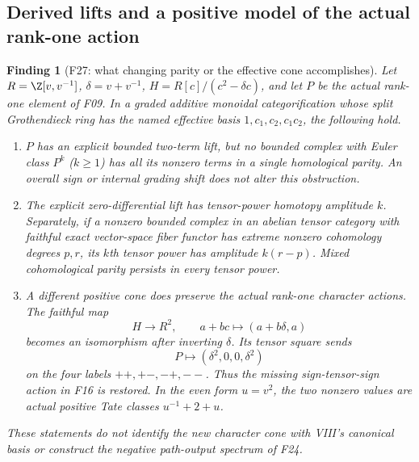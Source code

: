 \documentclass[11pt,a4paper]{article}
\newcommand{\fid}[1]{\textsf{#1}}\newcommand{\gate}[1]{\textsf{#1}}
\theoremstyle{named}\newtheorem{finding}{Finding}[section]
\theoremstyle{definition}\newtheorem{definition}[finding]{Definition}
\theoremstyle{remark}\newtheorem{remark}[finding]{Remark}
\begin{document}
\subsection{Derived lifts and a positive model of the actual rank-one action}
\begin{finding}[\fid{F27}: what changing parity or the effective cone accomplishes]\label{f:derived}
Let $R=\Z[v,v^{-1}]$, $\delta=v+v^{-1}$,
$H=R[c]/(c^2-\delta c)$, and let $P$ be the actual rank-one element
of \fid{F09}. In a graded additive monoidal categorification whose
split Grothendieck ring has the named effective basis
$1,c_1,c_2,c_1c_2$, the following hold.
\begin{enumerate}
\item $P$ has an explicit bounded two-term lift, but no bounded complex
with Euler class $P^k$ ($k\ge1$) has all its nonzero terms in a single
homological parity. An overall sign or internal grading shift does not
alter this obstruction.
\item The explicit zero-differential lift has tensor-power homotopy
amplitude $k$. Separately, if a nonzero bounded complex in an abelian tensor category
with faithful exact vector-space fiber functor has extreme nonzero
cohomology degrees $p,r$, its $k$th tensor power has amplitude $k(r-p)$.
Mixed cohomological parity persists in every tensor power.
\item A different positive cone does preserve the actual rank-one
character actions. The faithful map
\[
 H\longrightarrow R^2,\qquad a+bc\longmapsto(a+b\delta,a)
\]
becomes an isomorphism after inverting $\delta$. Its tensor square sends
\[
 P\longmapsto(\delta^2,0,0,\delta^2)
\]
on the four labels $++,+-,-+,--$. Thus the missing sign-tensor-sign
action in \fid{F16} is restored. In the even form $u=v^2$, the two
nonzero values are actual positive Tate classes
$u^{-1}+2+u$.
\end{enumerate}
These statements do not identify the new character cone with VIII's
canonical basis or construct the negative path-output spectrum of
\fid{F24}.
\end{finding}
\end{document}
